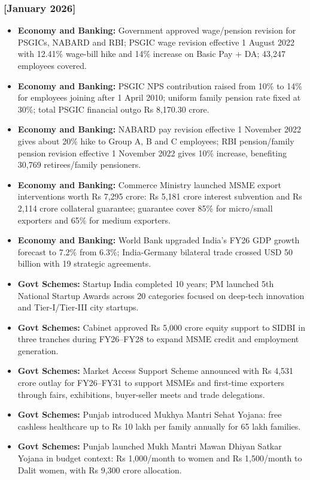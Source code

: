 \documentclass[10pt,a4paper]{article}
\newcommand{\monthtag}[1]{\textbf{[#1]}}
\begin{document}
\subsubsection{\monthtag{January 2026}}
\begin{itemize}
    \item \textbf{Economy and Banking:} Government approved wage/pension revision for PSGICs, NABARD and RBI; PSGIC wage revision effective 1 August 2022 with 12.41\% wage-bill hike and 14\% increase on Basic Pay + DA; 43,247 employees covered.
    \item \textbf{Economy and Banking:} PSGIC NPS contribution raised from 10\% to 14\% for employees joining after 1 April 2010; uniform family pension rate fixed at 30\%; total PSGIC financial outgo Rs 8,170.30 crore.
    \item \textbf{Economy and Banking:} NABARD pay revision effective 1 November 2022 gives about 20\% hike to Group A, B and C employees; RBI pension/family pension revision effective 1 November 2022 gives 10\% increase, benefiting 30,769 retirees/family pensioners.
    \item \textbf{Economy and Banking:} Commerce Ministry launched MSME export interventions worth Rs 7,295 crore: Rs 5,181 crore interest subvention and Rs 2,114 crore collateral guarantee; guarantee cover 85\% for micro/small exporters and 65\% for medium exporters.
    \item \textbf{Economy and Banking:} World Bank upgraded India's FY26 GDP growth forecast to 7.2\% from 6.3\%; India-Germany bilateral trade crossed USD 50 billion with 19 strategic agreements.
    \item \textbf{Govt Schemes:} Startup India completed 10 years; PM launched 5th National Startup Awards across 20 categories focused on deep-tech innovation and Tier-I/Tier-III city startups.
    \item \textbf{Govt Schemes:} Cabinet approved Rs 5,000 crore equity support to SIDBI in three tranches during FY26--FY28 to expand MSME credit and employment generation.
    \item \textbf{Govt Schemes:} Market Access Support Scheme announced with Rs 4,531 crore outlay for FY26--FY31 to support MSMEs and first-time exporters through fairs, exhibitions, buyer-seller meets and trade delegations.
    \item \textbf{Govt Schemes:} Punjab introduced Mukhya Mantri Sehat Yojana: free cashless healthcare up to Rs 10 lakh per family annually for 65 lakh families.
    \item \textbf{Govt Schemes:} Punjab launched Mukh Mantri Mawan Dhiyan Satkar Yojana in budget context: Rs 1,000/month to women and Rs 1,500/month to Dalit women, with Rs 9,300 crore allocation.

\end{itemize}
\end{document}
